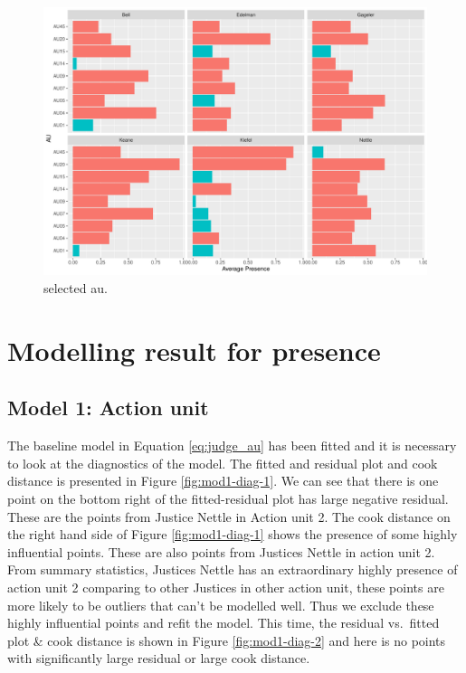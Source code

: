 \documentclass{monashthesis}
\begin{document}
\begin{figure}

{\centering \includegraphics[width=1\linewidth]{figures/selected-au-intensity-1} 

}

\caption{selected au.}\label{fig:selected-au-intensity}
\end{figure}

\newpage

\hypertarget{modelling-result-for-presence}{%
\section{Modelling result for presence}\label{modelling-result-for-presence}}

\hypertarget{model-1-action-unit-1}{%
\subsection{Model 1: Action unit}\label{model-1-action-unit-1}}

The baseline model in Equation \ref{eq:judge_au} has been fitted and it is necessary to look at the diagnostics of the model. The fitted and residual plot and cook distance is presented in Figure \ref{fig:mod1-diag-1}. We can see that there is one point on the bottom right of the fitted-residual plot has large negative residual. These are the points from Justice Nettle in Action unit 2. The cook distance on the right hand side of Figure \ref{fig:mod1-diag-1} shows the presence of some highly influential points. These are also points from Justices Nettle in action unit 2. From summary statistics, Justices Nettle has an extraordinary highly presence of action unit 2 comparing to other Justices in other action unit, these points are more likely to be outliers that can't be modelled well. Thus we exclude these highly influential points and refit the model. This time, the residual vs.~fitted plot \& cook distance is shown in Figure \ref{fig:mod1-diag-2} and here is no points with significantly large residual or large cook distance.
\end{document}
